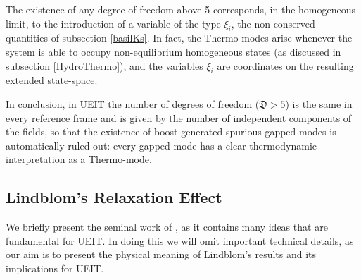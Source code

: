\documentclass[a4paper, amsfonts, amssymb, amsmath, reprint, twocolumn, showkeys, nofootinbib]{revtex4-2}
\begin{document}
The existence of any degree of freedom above 5 corresponds, in the homogeneous limit, to the introduction of a variable of the type $\xi_i$, the  non-conserved quantities of  subsection \ref{basilKs}. In fact, the Thermo-modes arise whenever the system is able to occupy non-equilibrium homogeneous states (as discussed in subsection \ref{HydroThermo}), and the variables $\xi_i$ are coordinates on the resulting extended state-space.

In conclusion, in UEIT the number of degrees of freedom ($\mathfrak{D}>5$) is the same in every reference frame and is given by the number of independent components of the fields, so that the existence of boost-generated spurious gapped modes is automatically ruled out: every gapped mode has a clear thermodynamic interpretation as a Thermo-mode.


\subsection{Lindblom's Relaxation Effect}\label{Lindddblumz}


We briefly present the seminal work of \citet{LindblomRelaxation1996}, as it contains many ideas that are fundamental for UEIT. In doing this we will omit important technical details, as our aim is to present the physical meaning of Lindblom's results and its implications for UEIT. 
\end{document}
